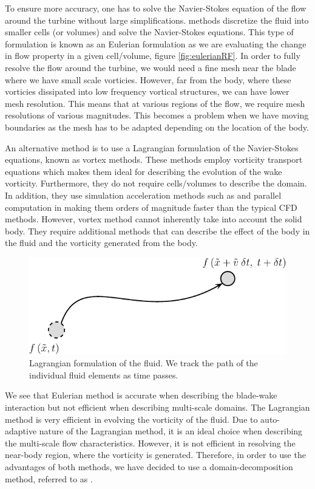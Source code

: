 To ensure more accuracy, one has to solve the Navier-Stokes equation of the flow around the turbine without large simplifications.  methods discretize the fluid into smaller cells (or volumes) and solve the Navier-Stokes equations. This type of formulation is known as an Eulerian formulation as we are evaluating the change in flow property in a given cell/volume, figure \ref{fig:eulerianRF}. In order to fully resolve the flow around the turbine, we would need a fine mesh near the blade where we have small scale vorticies. However, far from the body, where these vorticies dissipated into low frequency vortical structures, we can have lower mesh resolution. This means that at various regions of the flow, we require mesh resolutions of various magnitudes. This becomes a problem when we have moving boundaries as the mesh has to be adapted depending on the location of the body.

An alternative method is to use a Lagrangian formulation of the Navier-Stokes equations, known as vortex methods. These methods employ vorticity transport equations which makes them ideal for describing the evolution of the wake vorticity. Furthermore, they do not require cells/volumes to describe the domain. In addition, they use simulation acceleration methods such as  and parallel computation in  making them orders of magnitude faster than the typical CFD methods. However, vortex method cannot inherently take into account the solid body. They require additional methods that can describe the effect of the body in the fluid and the vorticity generated from the body.

	\begin{figure}[!t]
		\centering
		\includegraphics[width=0.6\linewidth]{figures/introduction/lagrangianRF2-crop.pdf}
		\caption{Lagrangian formulation of the fluid. We track the path of the individual fluid elements as time passes.}
		\label{fig:lagrangianRF}
	\end{figure}

We see that Eulerian method is accurate when describing the blade-wake interaction but not efficient when describing multi-scale domains. The Lagrangian method is very efficient in evolving the vorticity of the fluid. Due to auto-adaptive nature of the Lagrangian method, it is an ideal choice when describing the multi-scale flow characteristics. However, it is not efficient in resolving the near-body region, where the vorticity is generated. Therefore, in order to use the advantages of both methods, we have decided to use a domain-decomposition method, referred to as . 


